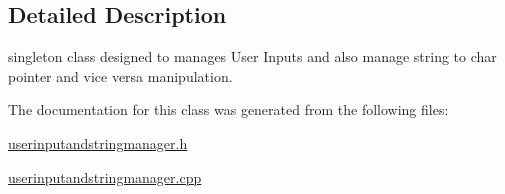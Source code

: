 \subsection{Detailed Description}
singleton class designed to manages User Inputs and also manage string to char pointer and vice versa manipulation. 

The documentation for this class was generated from the following files\+:\begin{DoxyCompactItemize}
\item 
\hyperlink{userinputandstringmanager_8h}{userinputandstringmanager.\+h}\item 
\hyperlink{userinputandstringmanager_8cpp}{userinputandstringmanager.\+cpp}\end{DoxyCompactItemize}
